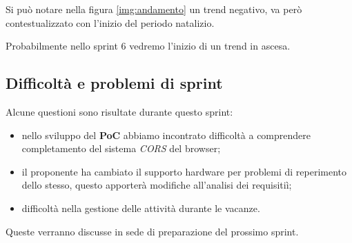 Si può notare nella figura \ref{img:andamento} un trend negativo, va però contestualizzato con l'inizio del periodo natalizio.

Probabilmente nello sprint 6 vedremo l'inizio di un trend in ascesa.

\subsection{Difficoltà e problemi di sprint}

Alcune questioni sono risultate durante questo sprint:

\begin{itemize}
    \item nello sviluppo del \textbf{PoC} abbiamo incontrato difficoltà a comprendere completamento del sistema \textit{CORS} del browser;
    \item il proponente ha cambiato il supporto hardware per problemi di reperimento dello stesso, questo apporterà modifiche all'analisi dei requisitiì;
    \item difficoltà nella gestione delle attività durante le vacanze.
\end{itemize}

Queste verranno discusse in sede di preparazione del prossimo sprint.
